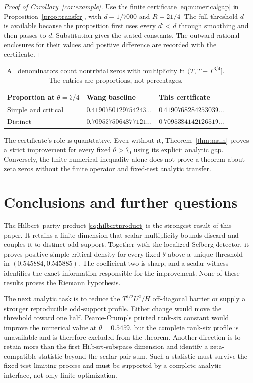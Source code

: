 \documentclass[11pt]{article}
\theoremstyle{remark}
\begin{document}
\begin{proof}[Proof of Corollary~\ref{cor:example}]
Use the finite certificate \eqref{eq:numericalgap} in
Proposition~\ref{prop:transfer}, with $d=1/7000$ and $R=21/4$.
The full threshold $d$ is available because the proposition first uses
every $d'<d$ through smoothing and then passes to $d$. Substitution
gives the stated constants. The outward rational enclosures for their
values and positive difference are recorded with the certificate.
\end{proof}

\begin{table}[ht]
\centering
\begin{tabular}{@{}lll@{}}
\toprule
Proportion at $\theta=3/4$ & Wang baseline & This certificate\\
\midrule
Simple and critical & $0.4190750129754243\ldots$ & $0.4190768284253039\ldots$\\
Distinct & $0.7095375064877121\ldots$ & $0.7095384142126519\ldots$\\
\bottomrule
\end{tabular}
\caption{All denominators count nontrivial zeros with multiplicity in
$(T,T+T^{3/4}]$. The entries are proportions, not percentages.}
\end{table}

The certificate's role is quantitative. Even without it,
Theorem~\ref{thm:main} proves a strict improvement for every fixed
$\theta>\theta_0$ using its explicit analytic gap. Conversely, the
finite numerical inequality alone does not prove a theorem about zeta
zeros without the finite operator and fixed-test analytic transfer.

\section{Conclusions and further questions}

The Hilbert--parity product \eqref{eq:hilbertproduct} is the strongest result
of this paper. It retains a finite dimension that scalar multiplicity bounds
discard and couples it to distinct odd support. Together with the localized
Selberg detector, it proves positive simple-critical density for every fixed
$\theta$ above a unique threshold in $(0.545884,0.545885)$. The coefficient
two is sharp, and a scalar witness identifies the exact information responsible
for the improvement. None of these results proves the Riemann hypothesis.

The next analytic task is to reduce the $T^{1/2}U^2/H$ off-diagonal barrier or
supply a stronger reproducible odd-support profile. Either change would move
the threshold toward one half. Pearce-Crump's printed rank-six constant would
improve the numerical value at $\theta=0.5459$, but the complete rank-six
profile is unavailable and is therefore excluded from the theorem. Another
direction is to retain more than the first Hilbert-subspace dimension and
identify a zeta-compatible statistic beyond the scalar pair sum. Such a
statistic must survive the fixed-test limiting process and must be supported
by a complete analytic interface, not only finite optimization.
\end{document}
